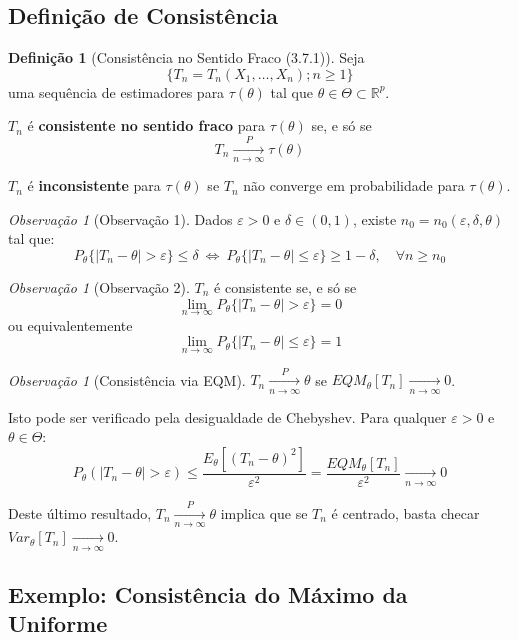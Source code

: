 \documentclass[12pt,a4paper]{article}
\theoremstyle{plain}
\theoremstyle{definition}
\newtheorem{definicao}[teorema]{Definição}
\theoremstyle{remark}
\newtheorem{observacao}[teorema]{Observação}
\begin{document}
\subsection{Definição de Consistência}

\begin{definicao}[Consistência no Sentido Fraco (3.7.1)]
Seja 
\[
\{T_n = T_n(X_1, \ldots, X_n); n \geq 1\}
\]
uma sequência de estimadores para $\tau(\theta)$ tal que $\theta \in \Theta \subset \mathbb{R}^p$.

$T_n$ é \textbf{consistente no sentido fraco} para $\tau(\theta)$ se, e só se
\[
T_n \xrightarrow[n \to \infty]{P} \tau(\theta)
\]

$T_n$ é \textbf{inconsistente} para $\tau(\theta)$ se $T_n$ não converge em probabilidade para $\tau(\theta)$.
\end{definicao}

\begin{observacao}[Observação 1]
Dados $\varepsilon > 0$ e $\delta \in (0,1)$, existe $n_0 = n_0(\varepsilon, \delta, \theta)$ tal que:
\[
P_\theta\{|T_n - \theta| > \varepsilon\} \leq \delta \ \Longleftrightarrow \ P_\theta\{|T_n - \theta| \leq \varepsilon\} \geq 1 - \delta, \quad \forall n \geq n_0
\]
\end{observacao}

\begin{observacao}[Observação 2]
$T_n$ é consistente se, e só se
\[
\lim_{n \to \infty} P_\theta\{|T_n - \theta| > \varepsilon\} = 0
\]
ou equivalentemente
\[
\lim_{n \to \infty} P_\theta\{|T_n - \theta| \leq \varepsilon\} = 1
\]
\end{observacao}

\begin{observacao}[Consistência via EQM]
$T_n \xrightarrow[n \to \infty]{P} \theta$ se $EQM_\theta[T_n] \xrightarrow[n \to \infty]{} 0$.

Isto pode ser verificado pela desigualdade de Chebyshev. Para qualquer $\varepsilon > 0$ e $\theta \in \Theta$:
\[
P_\theta\left( |T_n - \theta| > \varepsilon \right) \leq \frac{E_\theta\left[ (T_n - \theta)^2 \right]}{\varepsilon^2} = \frac{EQM_\theta[T_n]}{\varepsilon^2} \xrightarrow[n \to \infty]{} 0
\]

Deste último resultado, $T_n \xrightarrow[n \to \infty]{P} \theta$ implica que se $T_n$ é centrado, basta checar $Var_\theta[T_n] \xrightarrow[n \to \infty]{} 0$.
\end{observacao}

\subsection{Exemplo: Consistência do Máximo da Uniforme}
\end{document}
